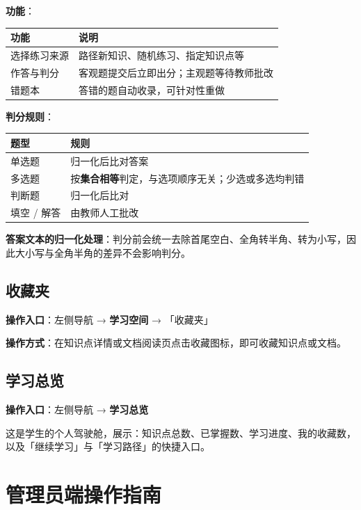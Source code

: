 \documentclass[UTF8,a4paper,11pt]{ctexrep}
\begin{document}
\textbf{功能}：

\begin{center}
\small
\begin{tabularx}{\linewidth}{@{}XX@{}}
\toprule
功能 & 说明 \\
\midrule
选择练习来源 & 路径新知识、随机练习、指定知识点等 \\
作答与判分 & 客观题提交后立即出分；主观题等待教师批改 \\
错题本 & 答错的题自动收录，可针对性重做 \\
\bottomrule
\end{tabularx}
\end{center}
\textbf{判分规则}：

\begin{center}
\small
\begin{tabularx}{\linewidth}{@{}XX@{}}
\toprule
题型 & 规则 \\
\midrule
单选题 & 归一化后比对答案 \\
多选题 & 按\textbf{集合相等}判定，与选项顺序无关；少选或多选均判错 \\
判断题 & 归一化后比对 \\
填空 / 解答 & 由教师人工批改 \\
\bottomrule
\end{tabularx}
\end{center}
\textbf{答案文本的归一化处理}：判分前会统一去除首尾空白、全角转半角、转为小写，因此大小写与全角半角的差异不会影响判分。


\subsection{收藏夹}

\textbf{操作入口}：左侧导航 → \textbf{学习空间} → 「收藏夹」

\textbf{操作方式}：在知识点详情或文档阅读页点击收藏图标，即可收藏知识点或文档。


\subsection{学习总览}

\textbf{操作入口}：左侧导航 → \textbf{学习总览}

这是学生的个人驾驶舱，展示：知识点总数、已掌握数、学习进度、我的收藏数，以及「继续学习」与「学习路径」的快捷入口。


\section{管理员端操作指南}
\end{document}
